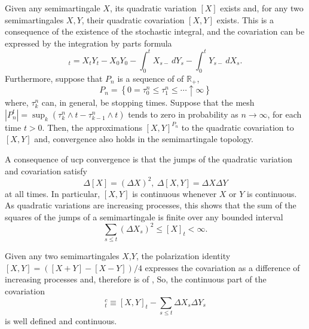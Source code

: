 \documentclass[12pt]{article}
\begin{document}

Given any semimartingale $X$, its quadratic variation $[X]$ exists and, for any two semimartingales $X,Y$, their quadratic covariation $[X,Y]$ exists. This is a consequence of the existence of the stochastic integral, and the covariation can be expressed by the integration by parts formula
\begin{equation*}
[X,Y]_t=X_tY_t-X_0Y_0-\int_0^tX_{s-}\,dY_s-\int_0^tY_{s-}\,dX_s.
\end{equation*}
Furthermore, suppose that $P_n$ is a sequence of  of $\mathbb{R}_+$,
\begin{equation*}
P_n=\left\{0=\tau^n_0\le\tau^n_1\le\cdots\uparrow\infty\right\}
\end{equation*}
where, $\tau^n_k$ can, in general, be stopping times. Suppose that the mesh $|P_n^t|=\sup_k(\tau^n_k\wedge t-\tau^n_{k-1}\wedge t)$ tends to zero in probability as $n\rightarrow\infty$, for each time $t>0$.
Then, the approximations $[X,Y]^{P_n}$ to the quadratic covariation  to $[X,Y]$ and, convergence also holds in the semimartingale topology.

A consequence of ucp convergence is that the jumps of the quadratic variation and covariation satisfy
\begin{equation*}
\Delta[X]=(\Delta X)^2,\ \Delta[X,Y]=\Delta X\Delta Y
\end{equation*}
at all times.
In particular, $[X,Y]$ is continuous whenever $X$ or $Y$ is continuous.
As quadratic variations are increasing processes, this shows that the sum of the squares of the jumps of a semimartingale is finite over any bounded interval
\begin{equation*}
\sum_{s\le t}(\Delta X_s)^2 \le [X]_t <\infty.
\end{equation*}

Given any two semimartingales $X$,$Y$, the polarization identity $[X,Y]=([X+Y]-[X-Y])/4$ expresses the covariation as a difference of increasing processes and, therefore is of , So, the continuous part of the covariation
\begin{equation*}
[X,Y]^c_t\equiv [X,Y]_t-\sum_{s\le t}\Delta X_s\Delta Y_s
\end{equation*}
is well defined and continuous.

\end{document}
